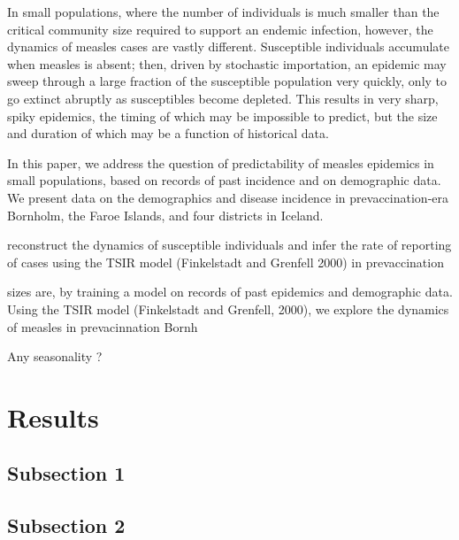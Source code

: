 \documentclass[10pt]{article}
\begin{document}
In small populations, where the number of individuals is much smaller than the critical community size required to support an endemic infection, however, the dynamics of measles cases are vastly different. Susceptible individuals accumulate when measles is absent; then, driven by stochastic importation, an epidemic may sweep through a large fraction of the susceptible population very quickly, only to go extinct abruptly as susceptibles become depleted. This results in very sharp, spiky epidemics, the timing of which may be impossible to predict, but the size and duration of which may be a function of historical data. 

In this paper, we address the question of predictability of measles epidemics in small populations, based on records of past incidence and on demographic data. We present data on the demographics and disease incidence in prevaccination-era Bornholm, the Faroe Islands, and four districts in Iceland. 

reconstruct the dynamics of susceptible individuals and infer the rate of reporting of cases using the TSIR model (Finkelstadt and Grenfell 2000) in prevaccination 
 
	

sizes are, by training a model on records of past epidemics and demographic data. Using the TSIR model (Finkelstadt and Grenfell, 2000), we explore the dynamics of measles in prevacinnation Bornh


Any seasonality ? 







\section*{Results}

\subsection*{Subsection 1}

\subsection*{Subsection 2}
\end{document}
